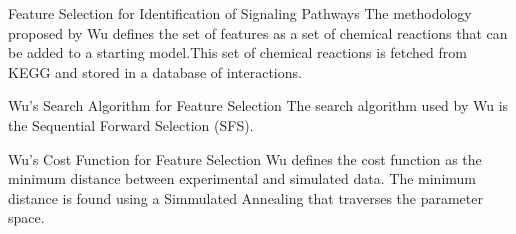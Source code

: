 \documentclass{beamer}
\begin{document}


\begin{frame}{Feature Selection for Identification of Signaling 
Pathways}
The methodology proposed by Wu defines the set of features as a set of 
chemical reactions that can be added to a starting model.\pause This set 
of chemical reactions is fetched from KEGG and stored in a database of
interactions.
\end{frame}


\begin{frame}{Wu's Search Algorithm for Feature Selection}
The search algorithm used by Wu is the Sequential Forward Selection 
(SFS).
\end{frame}


\begin{frame}{Wu's Cost Function for Feature Selection}
Wu defines the cost function as the minimum distance between 
experimental and simulated data. 
\pause
The minimum distance is found using a Simmulated Annealing 
that traverses the parameter space.
\end{frame}




\end{document}
